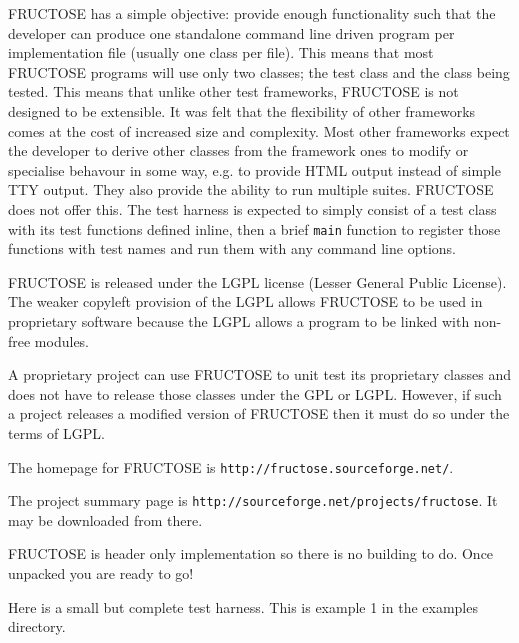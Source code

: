 \documentclass{book}
\begin{document}
FRUCTOSE has a simple objective: provide enough functionality such that the
developer can produce one standalone command line driven program per
implementation file (usually one class per file). This means that most
FRUCTOSE programs will use only two classes; the test class and the class
being tested. This means that unlike other test frameworks, FRUCTOSE is not
designed to be extensible.  It was felt that the flexibility of other
frameworks comes at the cost of increased size and complexity. Most other
frameworks expect the developer to derive other classes from the framework
ones to modify or specialise behavour in some way, e.g. to provide HTML output
instead of simple TTY output. They also provide the ability to run multiple
suites. FRUCTOSE does not offer this. The test harness is expected to simply
consist of a test class with its test functions defined inline, then a brief
{\tt main} function to register those functions with test names and run them
with any command line options.


FRUCTOSE is released under the LGPL license (Lesser General Public License).
The weaker copyleft provision of the LGPL allows FRUCTOSE to be used in 
proprietary software because the LGPL allows a program to be linked 
with non-free modules.

A proprietary project can use FRUCTOSE to unit test its proprietary
classes and does not have to release those classes under the GPL or LGPL.
However, if such a project releases a modified
version of FRUCTOSE then it must do so under the terms of LGPL.



The homepage for FRUCTOSE is {\tt http://fructose.sourceforge.net/}.

The project summary page is {\tt http://sourceforge.net/projects/fructose}.
It may be downloaded from there.

FRUCTOSE is header only implementation so there is no building to do.
Once unpacked you are ready to go!


Here is a small but complete test harness.
This is example 1 in the examples directory.
\end{document}

